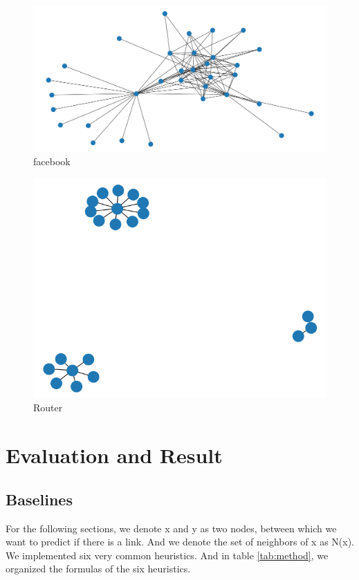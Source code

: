 \documentclass[12pt]{article}
\begin{document}
	
	\begin{figure}[h]
		\centering
		\includegraphics[scale=0.3]{Facebook}
		\caption{facebook}
		\label{fig:facebook}
	\end{figure}
	
	\begin{figure}[h]
		\centering
		\includegraphics[scale=0.3]{Router}
		\caption{Router}
		\label{fig:Router}
	\end{figure}
	\section{Evaluation and Result}
	
	\subsection{Baselines}
	For the following sections, we denote x and y as two nodes, between which we want to predict if there is a link. And we denote the set of neighbors of x as N(x). We implemented six very common heuristics. And in table \ref{tab:method}, we organized the formulas of the six heuristics. \\
\end{document}
